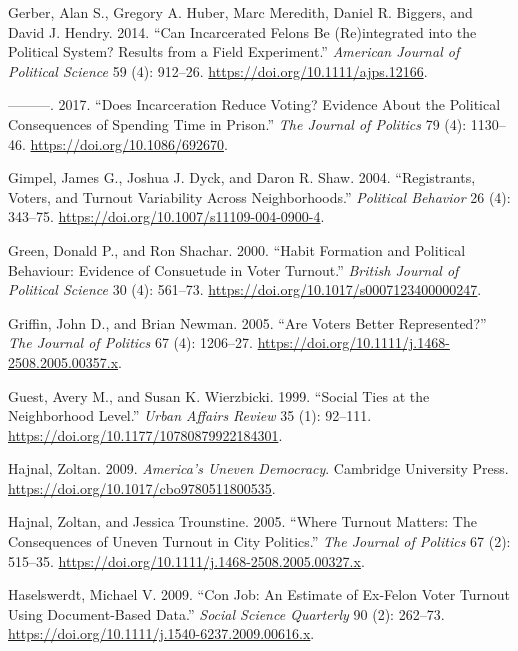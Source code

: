 \documentclass[12pt,]{article}
\begin{document}
\leavevmode\hypertarget{ref-Gerber2014}{}%
Gerber, Alan S., Gregory A. Huber, Marc Meredith, Daniel R. Biggers, and David J. Hendry. 2014. ``Can Incarcerated Felons Be (Re)integrated into the Political System? Results from a Field Experiment.'' \emph{American Journal of Political Science} 59 (4): 912--26. \url{https://doi.org/10.1111/ajps.12166}.

\leavevmode\hypertarget{ref-Gerber2017}{}%
---------. 2017. ``Does Incarceration Reduce Voting? Evidence About the Political Consequences of Spending Time in Prison.'' \emph{The Journal of Politics} 79 (4): 1130--46. \url{https://doi.org/10.1086/692670}.

\leavevmode\hypertarget{ref-Gimpel2004}{}%
Gimpel, James G., Joshua J. Dyck, and Daron R. Shaw. 2004. ``Registrants, Voters, and Turnout Variability Across Neighborhoods.'' \emph{Political Behavior} 26 (4): 343--75. \url{https://doi.org/10.1007/s11109-004-0900-4}.

\leavevmode\hypertarget{ref-Green2000}{}%
Green, Donald P., and Ron Shachar. 2000. ``Habit Formation and Political Behaviour: Evidence of Consuetude in Voter Turnout.'' \emph{British Journal of Political Science} 30 (4): 561--73. \url{https://doi.org/10.1017/s0007123400000247}.

\leavevmode\hypertarget{ref-Griffin2005}{}%
Griffin, John D., and Brian Newman. 2005. ``Are Voters Better Represented?'' \emph{The Journal of Politics} 67 (4): 1206--27. \url{https://doi.org/10.1111/j.1468-2508.2005.00357.x}.

\leavevmode\hypertarget{ref-Guest1999}{}%
Guest, Avery M., and Susan K. Wierzbicki. 1999. ``Social Ties at the Neighborhood Level.'' \emph{Urban Affairs Review} 35 (1): 92--111. \url{https://doi.org/10.1177/10780879922184301}.

\leavevmode\hypertarget{ref-Hajnal2009}{}%
Hajnal, Zoltan. 2009. \emph{America's Uneven Democracy}. Cambridge University Press. \url{https://doi.org/10.1017/cbo9780511800535}.

\leavevmode\hypertarget{ref-Hajnal2005}{}%
Hajnal, Zoltan, and Jessica Trounstine. 2005. ``Where Turnout Matters: The Consequences of Uneven Turnout in City Politics.'' \emph{The Journal of Politics} 67 (2): 515--35. \url{https://doi.org/10.1111/j.1468-2508.2005.00327.x}.

\leavevmode\hypertarget{ref-Haselswerdt2009}{}%
Haselswerdt, Michael V. 2009. ``Con Job: An Estimate of Ex-Felon Voter Turnout Using Document-Based Data.'' \emph{Social Science Quarterly} 90 (2): 262--73. \url{https://doi.org/10.1111/j.1540-6237.2009.00616.x}.
\end{document}
